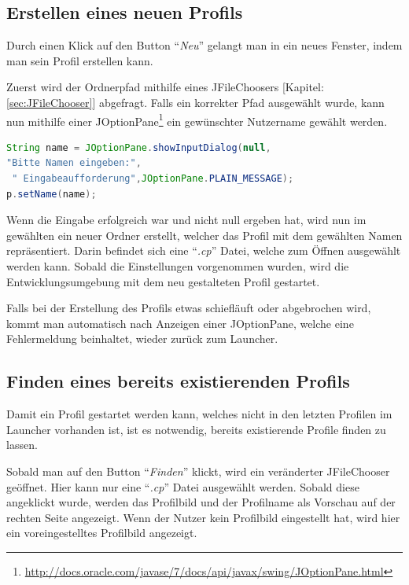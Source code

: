 \subsection{Erstellen eines neuen Profils}
Durch einen Klick auf den Button "`\textit{Neu}"' gelangt man in ein neues Fenster, indem man sein Profil erstellen kann.  

Zuerst wird der Ordnerpfad mithilfe eines JFileChoosers [Kapitel: \ref{sec:JFileChooser}] abgefragt. Falls ein korrekter Pfad ausgewählt wurde, kann nun mithilfe einer JOptionPane\footnote{\url{http://docs.oracle.com/javase/7/docs/api/javax/swing/JOptionPane.html}} ein gewünschter Nutzername gewählt werden. 
\begin{lstlisting}[language=JAVA]
String name = JOptionPane.showInputDialog(null,
"Bitte Namen eingeben:",
 " Eingabeaufforderung",JOptionPane.PLAIN_MESSAGE);
p.setName(name);
\end{lstlisting}

Wenn die Eingabe erfolgreich war und nicht null ergeben hat, wird nun im gewählten ein neuer Ordner erstellt, welcher das Profil mit dem gewählten Namen repräsentiert. Darin befindet sich eine "`\textit{.cp}"' Datei, welche zum Öffnen ausgewählt werden kann. Sobald die Einstellungen vorgenommen wurden, wird die Entwicklungsumgebung mit dem neu gestalteten Profil gestartet.

Falls bei der Erstellung des Profils etwas schiefläuft oder abgebrochen wird, kommt man automatisch nach Anzeigen einer JOptionPane, welche eine Fehlermeldung beinhaltet, wieder zurück zum Launcher.

\subsection{Finden eines bereits existierenden Profils}
Damit ein Profil gestartet werden kann, welches nicht in den letzten Profilen im Launcher vorhanden ist, ist es notwendig, bereits existierende Profile finden zu lassen.

Sobald man auf den Button "`\textit{Finden}"' klickt, wird ein veränderter JFileChooser geöffnet. Hier kann nur eine "`\textit{.cp}"' Datei ausgewählt werden. Sobald diese angeklickt wurde, werden das Profilbild und der Profilname als Vorschau auf der rechten Seite angezeigt. Wenn der Nutzer kein Profilbild eingestellt hat, wird hier ein voreingestelltes Profilbild angezeigt.

